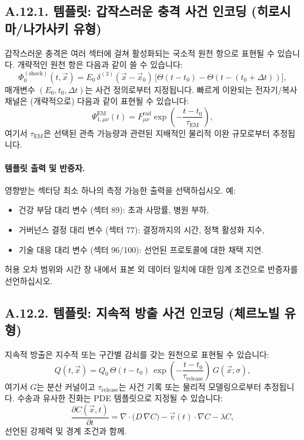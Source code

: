 \documentclass[13pt,a4paper]{article}
\begin{document}
\subsection*{A.12.1. 템플릿: 갑작스러운 충격 사건 인코딩 (히로시마/나가사키 유형)}

갑작스러운 충격은 여러 섹터에 걸쳐 활성화되는 국소적 원천 항으로 표현될 수 있습니다. 개략적인 원천 항은 다음과 같이 쓸 수 있습니다:
$$
\Phi_{0}^{(\mathrm{shock})}(t,\vec{x}) = E_0\,\delta^{(3)}(\vec{x}-\vec{x}_0)\,\big[\Theta(t-t_0)-\Theta(t-(t_0+\Delta t))\big],
$$
매개변수 $(E_0,t_0,\Delta t)$는 사건 정의로부터 지정됩니다. 빠르게 이완되는 전자기/복사 채널은 (개략적으로) 다음과 같이 표현될 수 있습니다:
$$
\Psi_{1,\mu\nu}^{\mathrm{EM}}(t)=F_{\mu\nu}^{\mathrm{rad}}\exp\!\left(-\frac{t-t_0}{\tau_{\mathrm{EM}}}\right),
$$
여기서 $\tau_{\mathrm{EM}}$은 선택된 관측 가능량과 관련된 지배적인 물리적 이완 규모로부터 추정됩니다.

\paragraph{템플릿 출력 및 반증자.}
영향받는 섹터당 최소 하나의 측정 가능한 출력을 선택하십시오. 예:
\begin{itemize}[leftmargin=*]
	\item 건강 부담 대리 변수 (섹터 89): 초과 사망률, 병원 부하,
	\item 거버넌스 결정 대리 변수 (섹터 77): 결정까지의 시간, 정책 활성화 지수,
	\item 기술 대응 대리 변수 (섹터 96/100): 선언된 프로토콜에 대한 채택 지연.
\end{itemize}
허용 오차 범위와 시간 창 내에서 표본 외 데이터 일치에 대한 임계 조건으로 반증자를 선언하십시오.

\subsection*{A.12.2. 템플릿: 지속적 방출 사건 인코딩 (체르노빌 유형)}

지속적 방출은 지수적 또는 구간별 감쇠를 갖는 원천으로 표현될 수 있습니다:
$$
Q(t,\vec{x}) = Q_0\,\Theta(t-t_0)\,\exp\!\left(-\frac{t-t_0}{\tau_{\mathrm{release}}}\right)\,G(\vec{x};\sigma),
$$
여기서 $G$는 분산 커널이고 $\tau_{\mathrm{release}}$는 사건 기록 또는 물리적 모델링으로부터 추정됩니다. 수송과 유사한 진화는 PDE 템플릿으로 지정될 수 있습니다:
$$
\frac{\partial C(\vec{x},t)}{\partial t}
= \nabla\cdot\big(D\,\nabla C\big) - \vec{v}(t)\cdot\nabla C - \lambda C,
$$
선언된 강제력 및 경계 조건과 함께.
\end{document}
